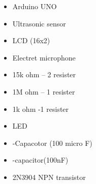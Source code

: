 \documentclass[12pt]{article}
\begin{document}
\begin{itemize}
	\item {\fontsize{14pt}{16.8pt}\selectfont Arduino UNO\par}\par

	\item {\fontsize{14pt}{16.8pt}\selectfont Ultrasonic sensor\par}\par

	\item {\fontsize{14pt}{16.8pt}\selectfont LCD (16x2)\par}\par

	\item {\fontsize{14pt}{16.8pt}\selectfont Electret microphone\par}\par

	\item {\fontsize{14pt}{16.8pt}\selectfont 15k ohm – 2 resister\par}\par

	\item {\fontsize{14pt}{16.8pt}\selectfont 1M ohm – 1 resister\par}\par

	\item {\fontsize{14pt}{16.8pt}\selectfont 1k ohm -1 resister\par}\par

	\item {\fontsize{14pt}{16.8pt} LED\par}\par

	\item {\fontsize{14pt}{16.8pt}-Capacotor (100 micro F)\par}\par

	\item {\fontsize{14pt}{16.8pt}-capacitor(100nF)\par}\par

	\item {\fontsize{14pt}{16.8pt}\selectfont 2N3904 NPN transistor\par}
\end{itemize}\par
\end{document}
